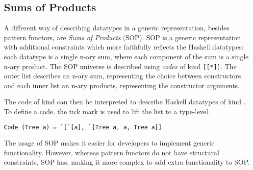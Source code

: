 \subsection{Sums of Products}
A different way of describing datatypes in a generic representation, besides pattern functors, are \textit{Sums of Products}\cite{vries2014sums} (SOP). SOP is a generic representation with additional constraints which more faithfully reflects the Haskell datatypes: each datatype is a single n-ary sum, where each component of the sum is a single n-ary product. The SOP universe is described using \textit{codes} of kind \texttt{[[*]]}. The outer list describes an n-ary sum, representing the choice between constructors and each inner list an n-ary products, representing the constructor arguments. 

The code of kind \inlinehaskell{[[*]]} can then be interpreted to describe Haskell datatypes of kind \inlinehaskell{*}. To define a code, the tick mark  is used to lift the list to a type-level. 

\begin{verbatim}
Code (Tree a) = `[`[a], `[Tree a, a, Tree a]]
\end{verbatim}

The usage of SOP makes it easier for developers to implement generic functionality. However, whereas pattern functors do not have structural constraints, SOP has, making it more complex to add extra functionality to SOP.

